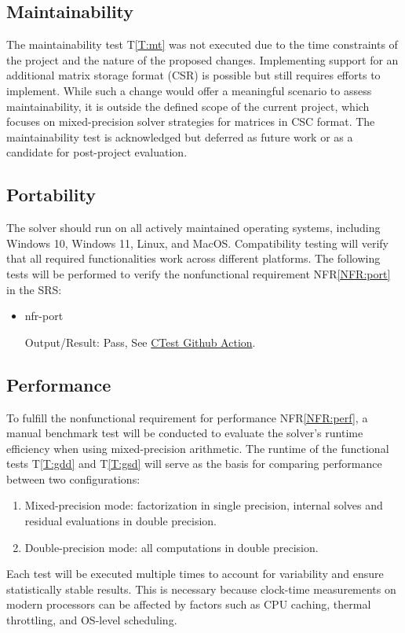 \documentclass[12pt, titlepage]{article}
\newcommand{\nfrref}[1]{NFR\ref{#1}}
\newcommand{\tref}[1]{T\ref{#1}}
\begin{document}
\subsection{Maintainability}

The maintainability test \tref{T:mt} was not executed due to the time
constraints of the project and the nature of the proposed changes. Implementing
support for an additional matrix storage format (CSR) is possible but still
requires efforts to implement. While such a change would offer a meaningful
scenario to assess maintainability, it is outside the defined scope of the
current project, which focuses on mixed-precision solver strategies for matrices
in CSC format. The maintainability test is acknowledged but deferred as future
work or as a candidate for post-project evaluation.


\subsection{Portability}

The solver should run on all actively maintained operating systems, including
Windows 10, Windows 11, Linux, and MacOS. Compatibility testing will verify that
all required functionalities work across different platforms. The following
tests will be performed to verify the nonfunctional requirement \nfrref{NFR:port}
in the SRS:

\begin{itemize}

\item[\tref{T:port}:]{nfr-port}

Output/Result: Pass, See
\href{https://github.com/yex33/MPIR/actions/workflows/ctest.yml}{CTest Github Action}.

\end{itemize}

\subsection{Performance}

To fulfill the nonfunctional requirement for performance \nfrref{NFR:perf}, a
manual benchmark test will be conducted to evaluate the solver’s runtime
efficiency when using mixed-precision arithmetic. The runtime of the functional
tests \tref{T:gdd} and \tref{T:gsd} will serve as the basis for comparing
performance between two configurations:
\begin{enumerate}
\item Mixed-precision mode: factorization in single precision, internal solves and
  residual evaluations in double precision.
\item Double-precision mode: all computations in double precision.
\end{enumerate}
Each test will be executed multiple times to account for variability and ensure
statistically stable results. This is necessary because clock-time measurements
on modern processors can be affected by factors such as CPU caching, thermal
throttling, and OS-level scheduling.
\end{document}
